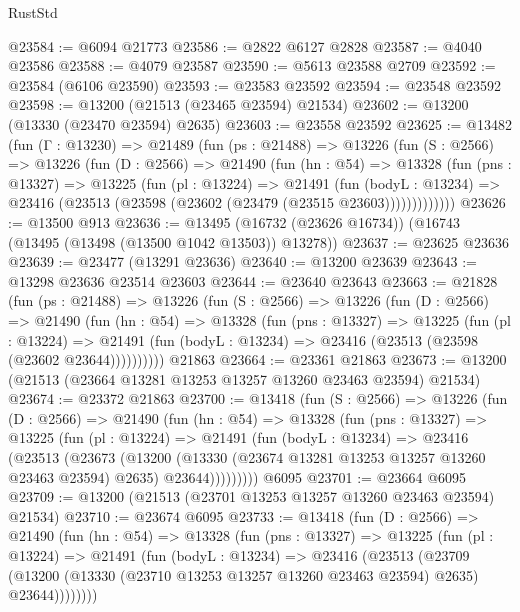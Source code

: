 \begin{lexlean}{RustStd}
\begin{coremodule}
@23584 := @6094 @21773
@23586 := @2822 @6127 @2828
@23587 := @4040 @23586
@23588 := @4079 @23587
@23590 := @5613 @23588 @2709
@23592 := @23584 (@6106 @23590)
@23593 := @23583 @23592
@23594 := @23548 @23592
@23598 := @13200 (@21513 (@23465 @23594) @21534)
@23602 := @13200 (@13330 (@23470 @23594) @2635)
@23603 := @23558 @23592
@23625 := @13482
    (fun (Γ : @13230) =>
    @21489
      (fun (ps : @21488) =>
      @13226
        (fun (S : @2566) =>
        @13226
          (fun (D : @2566) =>
          @21490
            (fun (hn : @54) =>
            @13328
              (fun (pns : @13327) =>
              @13225
                (fun (pl : @13224) =>
                @21491
                  (fun (bodyL : @13234) =>
                  @23416 (@23513 (@23598 (@23602 (@23479 (@23515 @23603)))))))))))))
@23626 := @13500 @913
@23636 := @13495 (@16732 (@23626 @16734)) (@16743 (@13495 (@13498 (@13500 @1042 @13503)) @13278))
@23637 := @23625 @23636
@23639 := @23477 (@13291 @23636)
@23640 := @13200 @23639
@23643 := @13298 @23636 @23514 @23603
@23644 := @23640 @23643
@23663 := @21828
    (fun (ps : @21488) =>
    @13226
      (fun (S : @2566) =>
      @13226
        (fun (D : @2566) =>
        @21490
          (fun (hn : @54) =>
          @13328
            (fun (pns : @13327) =>
            @13225
              (fun (pl : @13224) =>
              @21491 (fun (bodyL : @13234) => @23416 (@23513 (@23598 (@23602 @23644))))))))))
    @21863
@23664 := @23361 @21863
@23673 := @13200 (@21513 (@23664 @13281 @13253 @13257 @13260 @23463 @23594) @21534)
@23674 := @23372 @21863
@23700 := @13418
    (fun (S : @2566) =>
    @13226
      (fun (D : @2566) =>
      @21490
        (fun (hn : @54) =>
        @13328
          (fun (pns : @13327) =>
          @13225
            (fun (pl : @13224) =>
            @21491
              (fun (bodyL : @13234) =>
              @23416
                (@23513
                  (@23673
                    (@13200
                      (@13330 (@23674 @13281 @13253 @13257 @13260 @23463 @23594) @2635)
                      @23644)))))))))
    @6095
@23701 := @23664 @6095
@23709 := @13200 (@21513 (@23701 @13253 @13257 @13260 @23463 @23594) @21534)
@23710 := @23674 @6095
@23733 := @13418
    (fun (D : @2566) =>
    @21490
      (fun (hn : @54) =>
      @13328
        (fun (pns : @13327) =>
        @13225
          (fun (pl : @13224) =>
          @21491
            (fun (bodyL : @13234) =>
            @23416
              (@23513
                (@23709
                  (@13200 (@13330 (@23710 @13253 @13257 @13260 @23463 @23594) @2635) @23644))))))))

\end{coremodule}
\end{lexlean}

